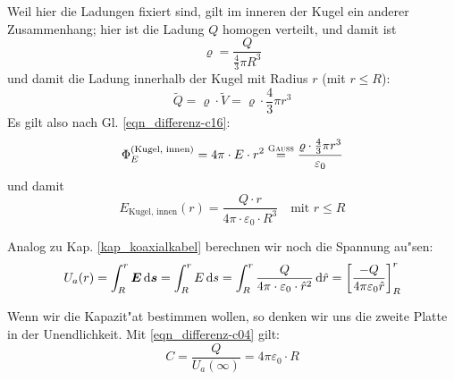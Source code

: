 Weil hier die Ladungen fixiert sind, gilt im inneren der Kugel ein
anderer Zusammenhang; hier ist die Ladung $Q$ homogen verteilt, und damit
ist
$$
\varrho = \frac{Q}{\frac{4}{3} \pi R^3}
$$
und damit die Ladung innerhalb der Kugel mit Radius $r$ (mit $r \leq
R$):
$$
\tilde Q = \varrho \cdot \tilde V = \varrho \cdot \frac{4}{3} \pi r^3
$$
Es gilt also nach Gl. \eqref{eqn_differenz-c16}:
\begin{equation}
   \label{eqn_differenz-c08}
     \Phi_E^{(\text{Kugel, innen})} =
4 \pi  \cdot E \cdot r^2 \stackrel{\text{\textsc{Gauss}}}{=} \frac{\varrho \cdot \frac{4}{3} \pi r^3}{\varepsilon_0}
\end{equation}
und damit
\begin{equation}
   \label{eqn_differenz-c17}
\boxed{   E_\text{Kugel, innen}(r) = \frac{Q \cdot
   r}{4\pi \cdot \varepsilon_0 \cdot R^3} }
~ ~ ~ \text{ mit } r \leq R
\end{equation}


\bigskip
Analog zu Kap. \ref{kap_koaxialkabel} berechnen wir noch die Spannung au"sen:
\begin{equation}
   \label{eqn_differenz-c18}
   U_a(r) = \int_R^r \boldsymbol{E} \, \mathrm{d} \boldsymbol{s} = \int_R^r E \, \mathrm{d} s
=
\int_R^r \frac{Q}{4 \pi \cdot \varepsilon_0 \cdot \hat r^2} \, \mathrm{d} \hat
r = \left [\frac{-Q}{4\pi \varepsilon_0 \hat r} \right ]_R^r
\end{equation}

Wenn wir die Kapazit"at bestimmen wollen, so denken wir uns die zweite
Platte in der Unendlichkeit. Mit \eqref{eqn_differenz-c04} gilt:
\begin{equation}
   \label{eqn_differenz-c19}
   C = \frac{Q}{U_a(\infty)} = 4 \pi \varepsilon_0 \cdot R
\end{equation}

